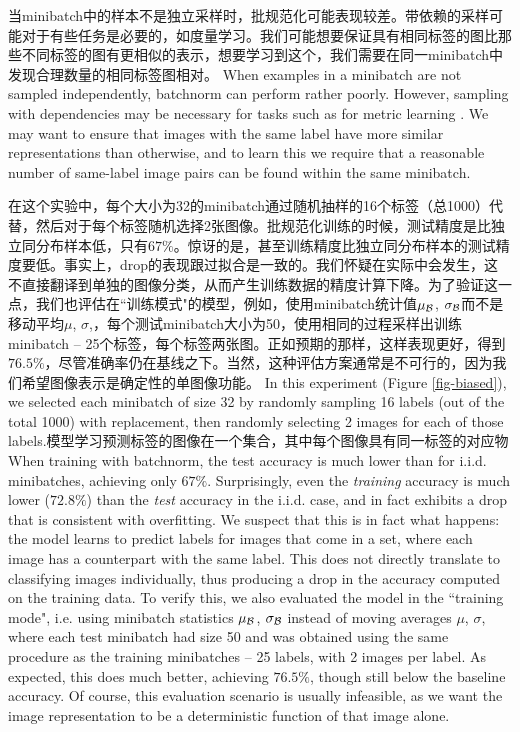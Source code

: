 当minibatch中的样本不是独立采样时，批规范化可能表现较差。带依赖的采样可能对于有些任务是必要的，如度量学习。我们可能想要保证具有相同标签的图比那些不同标签的图有更相似的表示，想要学习到这个，我们需要在同一minibatch中发现合理数量的相同标签图相对。
When examples in a minibatch are not sampled independently, batchnorm can
perform rather poorly. However, sampling with dependencies  may be necessary for tasks such as for metric learning \cite{nca,facenet}. We may want to ensure that images with the same label have more similar representations than otherwise, and to learn this we require that a reasonable number of same-label image pairs can be found within the same minibatch.

在这个实验中，每个大小为32的minibatch通过随机抽样的16个标签（总1000）代替，然后对于每个标签随机选择2张图像。批规范化训练的时候，测试精度是比独立同分布样本低，只有$67\%$。惊讶的是，甚至训练精度比独立同分布样本的测试精度要低。事实上，drop的表现跟过拟合是一致的。我们怀疑在实际中会发生，这不直接翻译到单独的图像分类，从而产生训练数据的精度计算下降。为了验证这一点，我们也评估在``训练模式"的模型，例如，使用minibatch统计值$\mu_{\mathcal{B}}$, $\sigma_{\mathcal{B}}$而不是移动平均$\mu$, $\sigma$,，每个测试minibatch大小为50，使用相同的过程采样出训练minibatch -- 25个标签，每个标签两张图。正如预期的那样，这样表现更好，得到$76.5\%$，尽管准确率仍在基线之下。当然，这种评估方案通常是不可行的，因为我们希望图像表示是确定性的单图像功能。
In this experiment (Figure \ref{fig-biased}), we selected each minibatch of size 32 by randomly sampling 16 labels (out of the total 1000) with replacement, then randomly selecting 2 images for each of those labels.模型学习预测标签的图像在一个集合，其中每个图像具有同一标签的对应物
When training with batchnorm, the test accuracy is much lower than for i.i.d. minibatches, achieving only $67\%$. Surprisingly, even the {\em training} accuracy is much lower ($72.8\%$) than the {\em test} accuracy in the i.i.d. case, and in fact exhibits a drop that is consistent with overfitting. We suspect that this is in fact what happens: the model learns to predict labels for images that come in a set, where each image has a counterpart with the same label. This does not directly translate to classifying images individually, thus producing a drop in the accuracy computed on the training data. To verify this, we also evaluated the model in the ``training mode", i.e. using minibatch statistics $\mu_{\mathcal{B}}$, $\sigma_{\mathcal{B}}$ instead of moving averages $\mu$, $\sigma$, where each test minibatch had size 50 and was obtained using the same procedure as the training minibatches -- 25 labels, with 2 images per label. As expected, this does much better, achieving $76.5\%$, though still below the baseline accuracy. Of course, this evaluation scenario is usually infeasible, as we want the image representation to be a deterministic function of that image alone.

